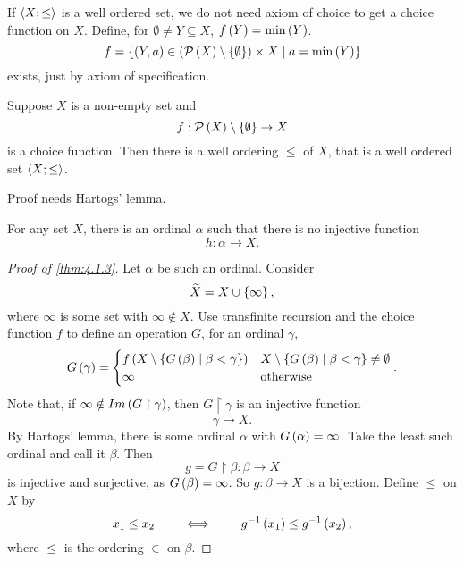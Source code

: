 \begin{note}
If $ \left\langle X; \le \right\rangle $ is a well ordered set, we do not need axiom of choice to get a choice function on $ X $. Define, for $ \emptyset \ne Y \subseteq X $, $ f\left( Y \right) = \min\left( Y \right) $.
$$ f = \left\{ \left( Y, a \right) \in \left( \mathcal{P}\left( X \right) \setminus \left\{ \emptyset \right\} \right) \times X \mid a = \min\left( Y \right) \right\} $$
exists, just by axiom of specification. 
\end{note}

\begin{theorem}
\label{thm:4.1.3}
Suppose $ X $ is a non-empty set and
$$ f : \mathcal{P}\left( X \right) \setminus \left\{ \emptyset \right\} \to X $$
is a choice function. Then there is a well ordering $ \le $ of $ X $, that is a well ordered set $ \left\langle X; \le \right\rangle $.
\end{theorem}

Proof needs Hartogs' lemma.

\begin{lemma}
\label{lem:4.1.4}
For any set $ X $, there is an ordinal $ \alpha $ such that there is no injective function
$$ h : \alpha \to X. $$
\end{lemma}

\begin{proof}[Proof of \ref{thm:4.1.3}]
Let $ \alpha $ be such an ordinal. Consider
$$ \widetilde{X} = X \cup \left\{ \infty \right\}, $$
where $ \infty $ is some set with $ \infty \notin X $. Use transfinite recursion and the choice function $ f $ to define an operation $ G $, for an ordinal $ \gamma $,
$$ G\left( \gamma \right) = \begin{cases}
f\left( X \setminus \left\{ G\left( \beta \right) \mid \beta < \gamma \right\} \right) & X \setminus \left\{ G\left( \beta \right) \mid \beta < \gamma \right\} \ne \emptyset \\
\infty & \text{otherwise}
\end{cases}. $$
Note that, if $ \infty \notin Im\left( G \upharpoonright \gamma \right) $, then $ G \upharpoonright \gamma $ is an injective function
$$ \gamma \to X. $$
By Hartogs' lemma, there is some ordinal $ \alpha $ with $ G\left( \alpha \right) = \infty $. Take the least such ordinal and call it $ \beta $. Then
$$ g = G \upharpoonright \beta : \beta \to X $$
is injective and surjective, as $ G\left( \beta \right) = \infty $. So $ g : \beta \to X $ is a bijection. Define $ \le $ on $ X $ by
$$ x_1 \le x_2 \qquad \iff \qquad g^{-1}\left( x_1 \right) \le g^{-1}\left( x_2 \right), $$
where $ \le $ is the ordering $ \in $ on $ \beta $.
\end{proof}

\pagebreak

